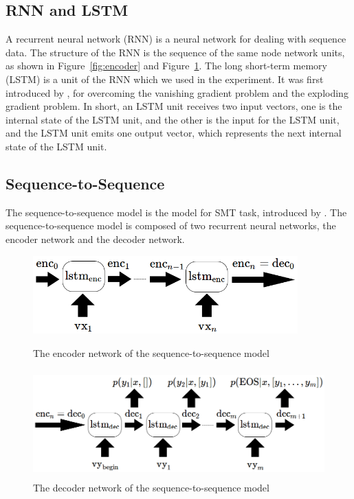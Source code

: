 \documentclass[senior,final,11pt]{iscs-thesis}
\begin{document}
\subsection{RNN and LSTM}
A recurrent neural network (RNN) is a neural network for dealing with sequence data.
The structure of the RNN is the sequence of the same node network units, as shown in Figure~\ref{fig:encoder} and Figure~\ref{fig:decoder}. 
The long short-term memory (LSTM) is a unit of the RNN which we used in the experiment. 
It was first introduced by \sloppy \citet{first_LSTM} , for overcoming the vanishing gradient problem and the exploding gradient problem.
In short, an LSTM unit receives two input vectors, 
one is the internal state of the LSTM unit, and the other is the input for the LSTM unit, 
and the LSTM unit emits one output vector, which represents the next internal state of the LSTM unit.

\subsection{Sequence-to-Sequence}


The sequence-to-sequence model is the model for SMT task, introduced by \citet{seq2seq}.
The sequence-to-sequence model is composed of two recurrent neural networks, the encoder network and the decoder network.

\begin{figure}[]
	\begin{center}
	\includegraphics[height=3cm]{encoder.png}
	\end{center}
	\caption{The encoder network of the sequence-to-sequence model}
	\label{fig:encoder}
	\begin{center}
	\includegraphics[height=4.2cm]{decoder.png}
	\end{center}
	\caption{ The decoder network of the sequence-to-sequence model}
	\label{fig:decoder}
\end{figure}
\end{document}
